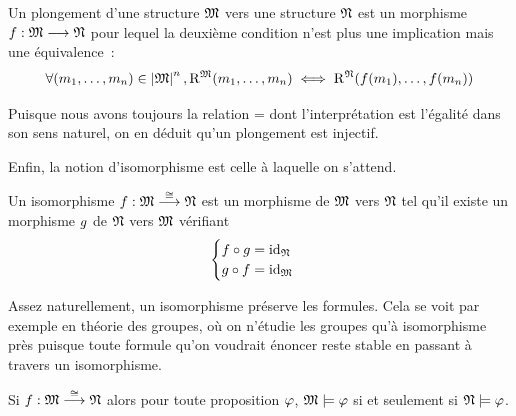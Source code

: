 \begin{definition}[Plongement]
  Un plongement d'une structure $\mathfrak{M}$ vers une structure $\mathfrak{N}$ est
  un morphisme $f : \displaystyle \mathfrak{M} \longrightarrow \mathfrak{N}$ pour lequel la deuxième
  condition n'est plus une implication mais une équivalence~:
  \[\forall(m_1,\ldots,m_n)\in\left\vert \mathfrak{M}\right\vert^n,
  \mathrm{R}^{\mathfrak{M}}(m_1,\ldots,m_n) \iff
  \mathrm{R}^{\mathfrak{N}}(f(m_1),\ldots,f(m_n))\]
\end{definition}

\begin{remark}
  Puisque nous avons toujours la relation $\mathord{=}$ dont
  l'interprétation est l'égalité dans son sens naturel, on en déduit
  qu'un plongement est injectif.
\end{remark}

Enfin, la notion d'isomorphisme est celle à laquelle on s'attend.

\begin{definition}[Isomorphisme]
  Un isomorphisme $f : \displaystyle \mathfrak{M} \overset{\cong}{\longrightarrow} \mathfrak{N}$ est un morphisme
  de $\mathfrak{M}$ vers $\mathfrak{N}$ tel qu'il existe un morphisme $g$ de
  $\mathfrak{N}$ vers $\mathfrak{M}$ vérifiant
  \[\begin{cases}
  f\circ g = \operatorname{id}_{\mathfrak{N}}\\
  g\circ f = \operatorname{id}_{\mathfrak{M}}
  \end{cases}\]
\end{definition}

Assez naturellement, un isomorphisme préserve les formules. Cela se voit par
exemple en théorie des groupes, où on n'étudie les groupes qu'à isomorphisme
près puisque toute formule qu'on voudrait énoncer reste stable en passant à
travers un isomorphisme.

\begin{proposition}\label{prop.isoEquivElt}
  Si $f : \displaystyle \mathfrak{M} \overset{\cong}{\longrightarrow} \mathfrak{N}$ alors pour toute proposition
  $\varphi$, $\mathfrak{M}\models \varphi$ si et seulement si $\mathfrak{N}\models\varphi$.
\end{proposition}

